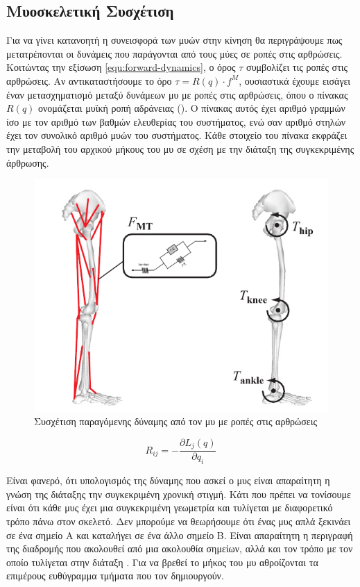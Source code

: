 \subsection{Μυοσκελετική Συσχέτιση}

Για να γίνει κατανοητή η συνεισφορά των μυών στην κίνηση θα περιγράψουμε πως μετατρέπονται οι δυνάμεις που παράγονται από τους μύες σε ροπές στις αρθρώσεις. Κοιτώντας την εξίσωση \ref{equ:forward-dynamics}, ο όρος $\tau$ συμβολίζει τις ροπές στις αρθρώσεις. Αν αντικαταστήσουμε το όρο $\tau = R(q) \cdot f^{M}$, ουσιαστικά έχουμε εισάγει έναν μετασχηματισμό μεταξύ δυνάμεων μυ με ροπές στις αρθρώσεις, όπου ο πίνακας $R(q)$ ονομάζεται μυϊκή ροπή αδράνειας (). Ο πίνακας αυτός έχει αριθμό γραμμών ίσο με τον αριθμό των βαθμών ελευθερίας του συστήματος, ενώ σαν αριθμό στηλών έχει τον συνολικό αριθμό μυών του συστήματος. Κάθε στοιχείο του πίνακα εκφράζει την μεταβολή του αρχικού μήκους του μυ σε σχέση με την διάταξη της συγκεκριμένης άρθρωσης.

\begin{figure}[H]
    \centering
    \includegraphics[width=.6\textwidth, height=.30\textheight]{neuromusculoskeletal/fig/muscle-skeleton-torque.png}
    \caption{Συσχέτιση παραγόμενης δύναμης από τον μυ με ροπές στις αρθρώσεις\cite{erdemir07}}
    \label{fig:force-torques}
\end{figure}

\begin{equation}
    R_{ij} = - \frac{\partial L_{j}(q)}{\partial q_{i}}
    \label{equ:muscle-moment-arm}
\end{equation}

Είναι φανερό, ότι υπολογισμός της δύναμης που ασκεί ο μυς είναι απαραίτητη η γνώση της διάταξης την συγκεκριμένη χρονική στιγμή. Κάτι που πρέπει να τονίσουμε είναι ότι κάθε μυς έχει μια συγκεκριμένη γεωμετρία και τυλίγεται με διαφορετικό τρόπο πάνω στον σκελετό. Δεν μπορούμε να θεωρήσουμε ότι ένας μυς απλά ξεκινάει σε ένα σημείο Α και καταλήγει σε ένα άλλο σημείο Β. Είναι απαραίτητη η περιγραφή της διαδρομής που ακολουθεί από μια ακολουθία σημείων, αλλά και τον τρόπο με τον οποίο τυλίγεται στην διάταξη \cite{delp95}. Για να βρεθεί το μήκος του μυ αθροίζονται τα επιμέρους ευθύγραμμα τμήματα που τον δημιουργούν.


